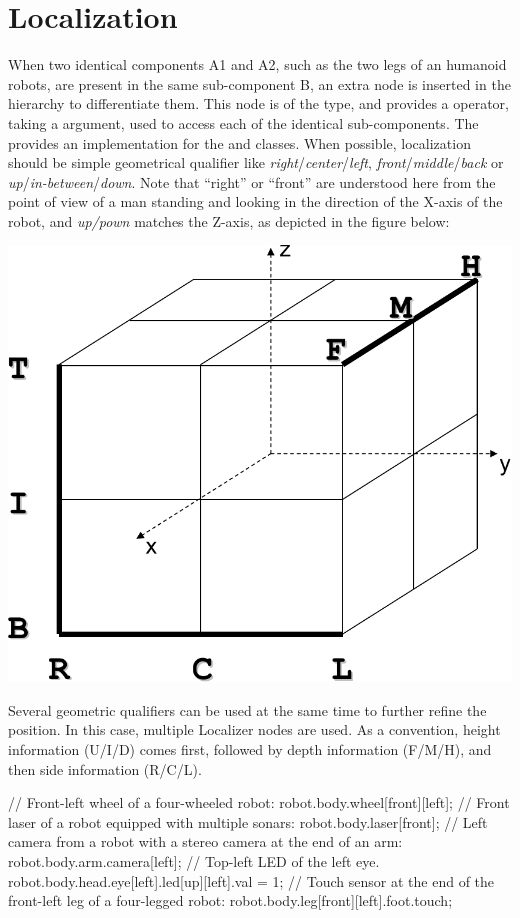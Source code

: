\section{Localization}
When two identical components A1 and A2, such as the two legs of an humanoid
robots, are present in the same sub-component B, an extra node is inserted in
the hierarchy to differentiate them. This node is of the  type,
and provides a \code{[]} operator, taking a  argument, used
to access each of the identical sub-components.
The \usdk provides an implementation for the  and
 classes.
When possible, localization should be simple geometrical qualifier like
\textit{right}/\textit{center}/\textit{left},
\textit{front}/\textit{middle}/\textit{back} or
\textit{up}/\textit{in-between}/\textit{down}.
Note that ``right'' or ``front'' are
understood here from the point of view of a man standing and looking
in the direction of the X-axis of the robot, and \textit{up/pown}
matches the Z-axis, as depicted in the figure below:

\begin{center}
  \includegraphics[width=.5\linewidth]{img/cube}
\end{center}

Several geometric qualifiers can be used at the same time to further
refine the position. In this case, multiple Localizer nodes are used.
As a convention, height information (U/I/D) comes first,
followed by depth information (F/M/H), and then side information (R/C/L).

\begin{urbiunchecked}
// Front-left wheel of a four-wheeled robot:
robot.body.wheel[front][left];
// Front laser of a robot equipped with multiple sonars:
robot.body.laser[front];
// Left camera from a robot with a stereo camera at the end of an arm:
robot.body.arm.camera[left];
// Top-left LED of the left eye.
robot.body.head.eye[left].led[up][left].val = 1;
// Touch sensor at the end of the front-left leg of a four-legged robot:
robot.body.leg[front][left].foot.touch;
\end{urbiunchecked}

